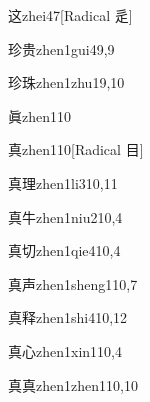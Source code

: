 \begin{verbete}{这}{zhei4}{7}[Radical 辵]
\end{verbete}

\begin{verbete}{珍贵}{zhen1gui4}{9,9}
\end{verbete}

\begin{verbete}{珍珠}{zhen1zhu1}{9,10}
\end{verbete}

\begin{verbete}{眞}{zhen1}{10}
\end{verbete}

\begin{verbete}{真}{zhen1}{10}[Radical 目]
\end{verbete}

\begin{verbete}{真理}{zhen1li3}{10,11}
\end{verbete}

\begin{verbete}{真牛}{zhen1niu2}{10,4}
\end{verbete}

\begin{verbete}{真切}{zhen1qie4}{10,4}
\end{verbete}

\begin{verbete}{真声}{zhen1sheng1}{10,7}
\end{verbete}

\begin{verbete}{真释}{zhen1shi4}{10,12}
\end{verbete}

\begin{verbete}{真心}{zhen1xin1}{10,4}
\end{verbete}

\begin{verbete}{真真}{zhen1zhen1}{10,10}
\end{verbete}

